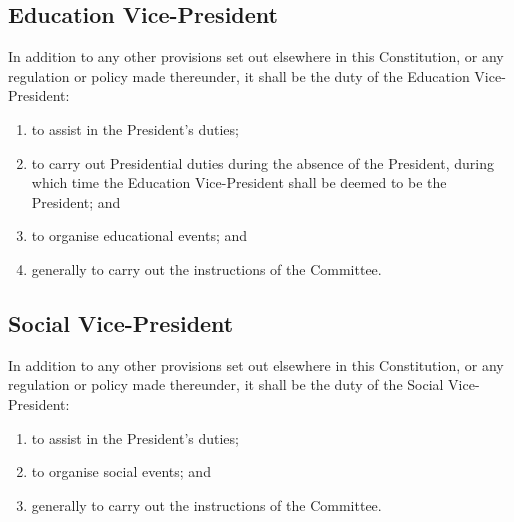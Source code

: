 \documentclass[11pt]{article} %
\begin{document}
{\color{ForestGreen} \subsection{Education Vice-President}
In addition to any other provisions set out elsewhere in this Constitution, or any regulation or policy made thereunder, it shall be the duty of the Education Vice-President:
\begin{enumerate}
	\item to assist in the President's duties;
	\item to carry out Presidential duties during the absence of the President, during which time the Education Vice-President shall be deemed to be the President; and
	\item to organise educational events; and
	\item generally to carry out the instructions of the Committee.
\end{enumerate}}

{\color{ForestGreen} \subsection{Social Vice-President}
In addition to any other provisions set out elsewhere in this Constitution, or any regulation or policy made thereunder, it shall be the duty of the Social Vice-President:
\begin{enumerate}
	\item to assist in the President's duties;
	\item to organise social events; and
	\item generally to carry out the instructions of the Committee.
\end{enumerate}}
\end{document}

